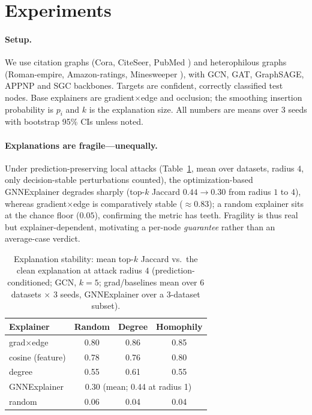 \documentclass[11pt]{article}
\begin{document}
\section{Experiments}
\paragraph{Setup.} We use citation graphs (Cora, CiteSeer, PubMed
\citep{yang2016planetoid,sen2008collective}) and heterophilous graphs
(Roman-empire, Amazon-ratings, Minesweeper \citep{platonov2023heterophily}), with
GCN, GAT, GraphSAGE, APPNP and SGC backbones. Targets are confident, correctly
classified test nodes. Base explainers are gradient$\times$edge and occlusion; the
smoothing insertion probability is $p_i$ and $k$ is the explanation size. All
numbers are means over 3 seeds with bootstrap 95\% CIs unless noted.

\paragraph{Explanations are fragile---unequally.} Under prediction-preserving
local attacks (Table~\ref{tab:frag}, mean over datasets, radius $4$, only
decision-stable perturbations counted), the optimization-based GNNExplainer
degrades sharply (top-$k$ Jaccard $0.44\!\to\!0.30$ from radius $1$ to $4$),
whereas gradient$\times$edge is comparatively stable ($\approx\!0.83$); a random
explainer sits at the chance floor ($0.05$), confirming the metric has teeth.
Fragility is thus real but explainer-dependent, motivating a per-node
\emph{guarantee} rather than an average-case verdict.

\begin{table}[h]\centering
\caption{Explanation stability: mean top-$k$ Jaccard vs.\ the clean explanation
at attack radius $4$ (prediction-conditioned; GCN, $k{=}5$; grad/baselines mean
over 6 datasets $\times$ 3 seeds, GNNExplainer over a 3-dataset subset).}
\label{tab:frag}
\begin{tabular}{lccc}
\toprule
Explainer & Random & Degree & Homophily \\ \midrule
grad$\times$edge & 0.80 & 0.86 & 0.85 \\
cosine (feature) & 0.78 & 0.76 & 0.80 \\
degree           & 0.55 & 0.61 & 0.55 \\
GNNExplainer     & \multicolumn{3}{c}{0.30 (mean; 0.44 at radius 1)} \\
random           & 0.06 & 0.04 & 0.04 \\ \bottomrule
\end{tabular}
\end{table}
\end{document}
